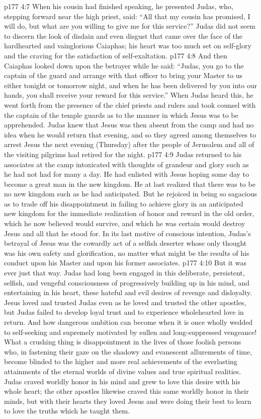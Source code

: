 \vs p177 4:7 When his cousin had finished speaking, he presented Judas, who, stepping forward near the high priest, said: “All that my cousin has promised, I will do, but what are you willing to give me for this service?” Judas did not seem to discern the look of disdain and even disgust that came over the face of the hardhearted and vainglorious Caiaphas; his heart was too much set on self\hyp{}glory and the craving for the satisfaction of self\hyp{}exaltation.
\vs p177 4:8 And then Caiaphas looked down upon the betrayer while he said: “Judas, you go to the captain of the guard and arrange with that officer to bring your Master to us either tonight or tomorrow night, and when he has been delivered by you into our hands, you shall receive your reward for this service.” When Judas heard this, he went forth from the presence of the chief priests and rulers and took counsel with the captain of the temple guards as to the manner in which Jesus was to be apprehended. Judas knew that Jesus was then absent from the camp and had no idea when he would return that evening, and so they agreed among themselves to arrest Jesus the next evening (Thursday) after the people of Jerusalem and all of the visiting pilgrims had retired for the night.
\vs p177 4:9 Judas returned to his associates at the camp intoxicated with thoughts of grandeur and glory such as he had not had for many a day. He had enlisted with Jesus hoping some day to become a great man in the new kingdom. He at last realized that there was to be no new kingdom such as he had anticipated. But he rejoiced in being so sagacious as to trade off his disappointment in failing to achieve glory in an anticipated new kingdom for the immediate realization of honor and reward in the old order, which he now believed would survive, and which he was certain would destroy Jesus and all that he stood for. In its last motive of conscious intention, Judas’s betrayal of Jesus was the cowardly act of a selfish deserter whose only thought was his own safety and glorification, no matter what might be the results of his conduct upon his Master and upon his former associates.\plusone
\vs p177 4:10 But it was ever just that way. Judas had long been engaged in this deliberate, persistent, selfish, and vengeful consciousness of progressively building up in his mind, and entertaining in his heart, these hateful and evil desires of revenge and disloyalty. Jesus loved and trusted Judas even as he loved and trusted the other apostles, but Judas failed to develop loyal trust and to experience wholehearted love in return. And how dangerous ambition can become when it is once wholly wedded to self\hyp{}seeking and supremely motivated by sullen and long\hyp{}suppressed vengeance! What a crushing thing is disappointment in the lives of those foolish persons who, in fastening their gaze on the shadowy and evanescent allurements of time, become blinded to the higher and more real achievements of the everlasting attainments of the eternal worlds of divine values and true spiritual realities. Judas craved worldly honor in his mind and grew to love this desire with his whole heart; the other apostles likewise craved this same worldly honor in their minds, but with their hearts they loved Jesus and were doing their best to learn to love the truths which he taught them.
